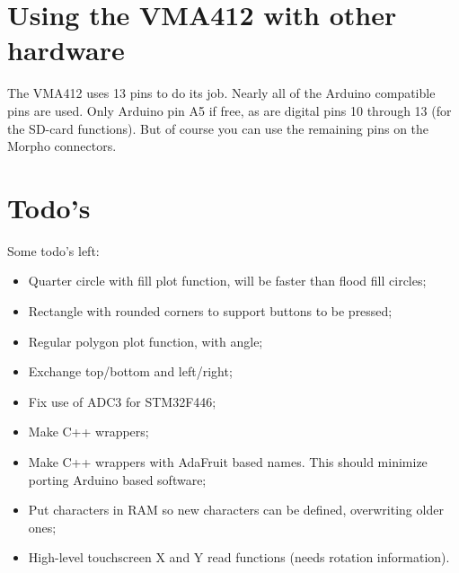 \documentclass[12pt]{article}
\begin{document}
\section{Using the VMA412 with other hardware}
The VMA412 uses 13 pins to do its job. Nearly all of the Arduino compatible pins are used. Only Arduino pin A5 if free, as are digital pins 10 through 13 (for the SD-card functions). But of course you can use the remaining pins on the Morpho connectors.


\section{Todo's}
Some todo's left:

\begin{itemize}
\item Quarter circle with fill plot function, will be faster than flood fill circles;
\item Rectangle with rounded corners to support buttons to be pressed;
\item Regular polygon plot function, with angle;
\item Exchange top/bottom and left/right;
\item Fix use of ADC3 for STM32F446;
\item Make C++ wrappers;
\item Make C++ wrappers with AdaFruit based names. This should minimize porting Arduino based software;
\item Put characters in RAM so new characters can be defined, overwriting older ones;
\item High-level touchscreen X and Y read functions (needs rotation information).
\end{itemize}

\cleardoublepage
{}
{}

\printindex
\end{document}
